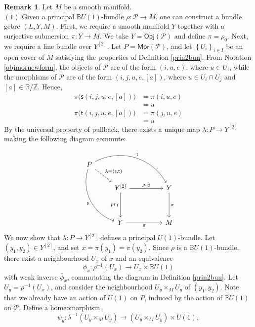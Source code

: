 \documentclass{article}
\theoremstyle{plain}
\theoremstyle{definition}
\newtheorem{rem}[thm]{Remark}
\begin{document}
\begin{rem}\label{butobunandconv}\cite[Section 7 on page 38]{MR3089401}
Let $M$ be a smooth manifold. \\
$(1)$ Given a principal $\mathbb{B}U(1)$-bundle $\rho:\mathcal{P} \longrightarrow M$, one can construct a bundle gebre $(L,Y,M)$. First, we require a smooth manifold $Y$ together with a surjective submersion $\pi:Y \longrightarrow M$. We take $Y = \mathsf{Obj}(\mathcal{P})$ and define $\pi = \rho_0$. Next, we require a line bundle over $Y^{[2]}$. Let $P = \mathsf{Mor}(\mathcal{P})$, and let $\left\{U_i\right\}_{i \in I}$ be an open cover of $M$ satisfying the properties of Definition \ref{prin2bun}. From Notation \ref{objmornewform}, the objects of $\mathcal{P}$ are of the form $(i,u,e)$, where $u \in U_i$, while the morphisms of $\mathcal{P}$ are of the form $(i,j,u,e,[a])$, where $u \in U_i \cap U_j$ and $[a] \in \mathbb{R}/\mathbb{Z}$. Hence,
\begin{align*}
\pi\bigl(\mathsf{s}(i,j,u,e,[a])\bigr) & = \pi(i,u,e) \\
& = u \\
\pi\bigl(\mathsf{t}(i,j,u,e,[a])\bigr) & = \pi(j,u,e) \\
& = u
\end{align*}
By the universal property of pullback, there exists a unique map $\lambda:P \longrightarrow Y^{[2]}$ making the following diagram commute:
\[
\begin{tikzcd}
P \arrow[drrr,bend left=45,"\mathsf{t}"] \arrow[dr,,dashed,"\lambda = {(\mathsf{s},\mathsf{t})}"] \arrow[dddr,bend right=45,"\mathsf{s}"'] & & & \\
& Y^{[2]} \arrow[rr,"pr_2"] \arrow[dd,"pr_1"'] & & Y \arrow[dd,"\pi"] \\
& & & \\
& Y \arrow[rr,"\pi"'] & & M 
\end{tikzcd}
\]
We now show that $\lambda:P \longrightarrow Y^{[2]}$ defines a principal $U(1)$-bundle. Let $(y_1,y_2) \in Y^{[2]}$, and set $x = \pi(y_1) = \pi(y_2)$. Since $\rho$ is a $\mathbb{B}U(1)$-bundle, there exist a neighbourhood $U_x$ of $x$ and an equivalence
$$\phi_x:\rho^{-1}(U_x) \longrightarrow U_x \times \mathbb{B}U(1)$$
with weak inverse $\bar{\phi}_x$, commutating the diagram in Definition \ref{prin2bun}. Let $U_y = \rho^{-1}(U_x)$, and consider the neighbourhood $U_y \times_{M} U_y$ of $(y_1,y_2)$. Note that we already have an action of $U(1)$ on $P$, induced by the action of $\mathbb{B}U(1)$ on $\mathcal{P}$. Define a homeomorphism 
$$\psi_y:\lambda^{-1}(U_y \times_M U_y) \longrightarrow (U_y \times_M U_y) \times U(1),$$

\end{rem}
\end{document}
